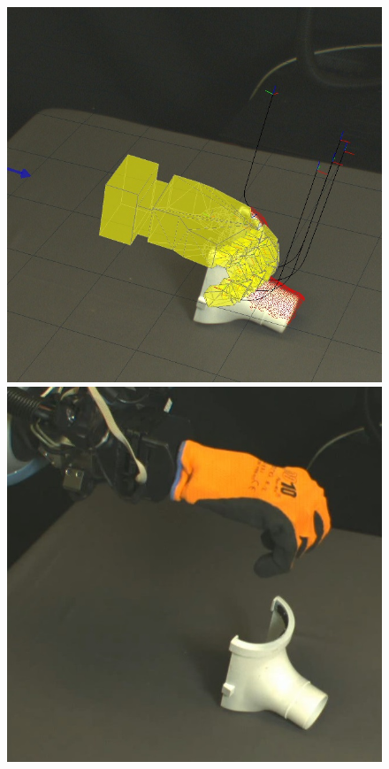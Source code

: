 \begin{figure}
\begin{center}
  \includegraphics[width=\tw]{images/experiments/query/guttering-1-s}
 \includegraphics[width=\tw]{images/experiments/exec/guttering-s}

\end{center}
\end{figure}
